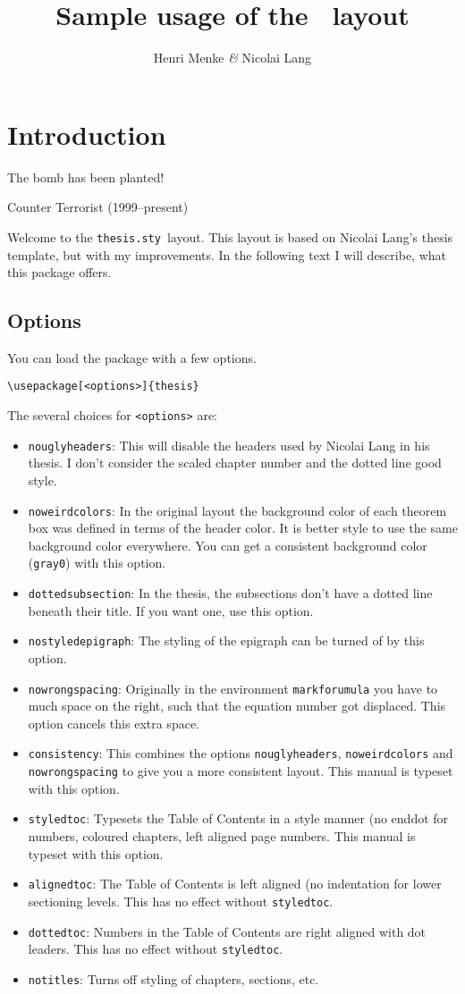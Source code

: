 \documentclass[book]{scrbook}
\title{Sample usage of the \thesis\ layout}
\author{Henri Menke {\rmfamily\itshape\&} Nicolai Lang}%
\institute{Institute for Theoretical Physics}
\newcommand\thesis{\texttt{thesis.sty}}
\begin{document}
\makethesistitle

\declaration

\tableofcontents

\chapter{Introduction}
\epigraph{The bomb has been planted!}{Counter Terrorist (1999--present)}	

Welcome to the \thesis\ layout. This layout is based on Nicolai Lang's thesis template, but with my improvements. In the following text I will describe, what this package offers.

\section{Options}

You can load the package with a few options.
\begin{verbatim}
\usepackage[<options>]{thesis}
\end{verbatim}
The several choices for \verb|<options>| are:
\begin{itemize}
\item \verb|nouglyheaders|: This will disable the headers used by Nicolai Lang in his thesis. I don't consider the scaled chapter number and the dotted line good style.
\item \verb|noweirdcolors|: In the original layout the background color of each theorem box was defined in terms of the header color. It is better style to use the same background color everywhere. You can get a consistent background color (\texttt{gray0}) with this option.
\item \verb|dottedsubsection|: In the thesis, the subsections don't have a dotted line beneath their title. If you want one, use this option.
\item \verb|nostyledepigraph|: The styling of the epigraph can be turned of by this option.
\item \verb|nowrongspacing|: Originally in the environment \verb|markforumula| you have to much space on the right, such that the equation number got displaced. This option cancels this extra space.
\item \verb|consistency|: This combines the options \verb|nouglyheaders|, \verb|noweirdcolors| and \verb|nowrongspacing| to give you a more consistent layout. This manual is typeset with this option.
\item \verb|styledtoc|: Typesets the Table of Contents in a style manner (no enddot for numbers, coloured chapters, left aligned page numbers. This manual is typeset with this option.
\item \verb|alignedtoc|: The Table of Contents is left aligned (no indentation for lower sectioning levels. This has no effect without \verb|styledtoc|.
\item \verb|dottedtoc|: Numbers in the Table of Contents are right aligned with dot leaders. This has no effect without \verb|styledtoc|.
\item \verb|notitles|: Turns off styling of chapters, sections, etc.
\end{itemize}
\end{document}
